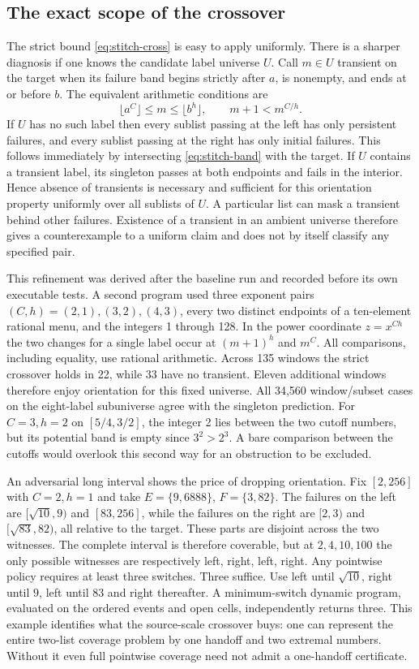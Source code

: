 \documentclass[12pt,letterpaper]{article}
\begin{document}
\subsection{The exact scope of the crossover}
The strict bound \eqref{eq:stitch-cross} is easy to apply uniformly. There is a sharper diagnosis if one knows the candidate label universe \(U\). Call \(m\in U\) transient on the target when its failure band begins strictly after \(a\), is nonempty, and ends at or before \(b\). The equivalent arithmetic conditions are
\[
       \lfloor a^C\rfloor\le m\le\lfloor b^h\rfloor,
       \qquad m+1<m^{C/h}.
\]
If \(U\) has no such label then every sublist passing at the left has only persistent failures, and every sublist passing at the right has only initial failures. This follows immediately by intersecting \eqref{eq:stitch-band} with the target. If \(U\) contains a transient label, its singleton passes at both endpoints and fails in the interior. Hence absence of transients is necessary and sufficient for this orientation property uniformly over all sublists of \(U\). A particular list can mask a transient behind other failures. Existence of a transient in an ambient universe therefore gives a counterexample to a uniform claim and does not by itself classify any specified pair.

This refinement was derived after the baseline run and recorded before its own executable tests. A second program used three exponent pairs \((C,h)=(2,1),(3,2),(4,3)\), every two distinct endpoints of a ten-element rational menu, and the integers 1 through 128. In the power coordinate \(z=x^{Ch}\) the two changes for a single label occur at \((m+1)^h\) and \(m^C\). All comparisons, including equality, use rational arithmetic. Across 135 windows the strict crossover holds in 22, while 33 have no transient. Eleven additional windows therefore enjoy orientation for this fixed universe. All 34,560 window/subset cases on the eight-label subuniverse agree with the singleton prediction. For \(C=3,h=2\) on \([5/4,3/2]\), the integer 2 lies between the two cutoff numbers, but its potential band is empty since \(3^2>2^3\). A bare comparison between the cutoffs would overlook this second way for an obstruction to be excluded.

An adversarial long interval shows the price of dropping orientation. Fix \([2,256]\) with \(C=2,h=1\) and take \(E=\{9,6888\}\), \(F=\{3,82\}\). The failures on the left are \([\sqrt{10},9)\) and \([83,256]\), while the failures on the right are \([2,3)\) and \([\sqrt{83},82)\), all relative to the target. These parts are disjoint across the two witnesses. The complete interval is therefore coverable, but at \(2,4,10,100\) the only possible witnesses are respectively left, right, left, right. Any pointwise policy requires at least three switches. Three suffice. Use left until \(\sqrt{10}\), right until \(9\), left until \(83\) and right thereafter. A minimum-switch dynamic program, evaluated on the ordered events and open cells, independently returns three. This example identifies what the source-scale crossover buys: one can represent the entire two-list coverage problem by one handoff and two extremal numbers. Without it even full pointwise coverage need not admit a one-handoff certificate.
\end{document}
